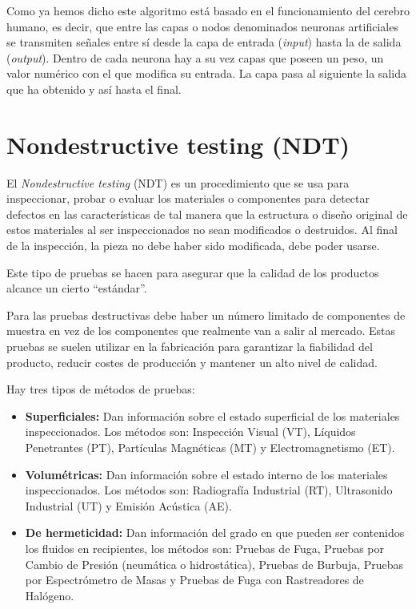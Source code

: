 Como ya hemos dicho este algoritmo está basado en el funcionamiento del cerebro humano, es decir, que entre las capas o nodos denominados neuronas artificiales se transmiten señales entre sí desde la capa de entrada (\textit{input}) hasta la de salida (\textit{output}). Dentro de cada neurona hay a su vez capas que poseen un peso, un valor numérico con el que modifica su entrada. La capa pasa al siguiente la salida que ha obtenido y así hasta el final.


\section{Nondestructive testing (NDT)}

El \textit{Nondestructive testing} (NDT) \cite{NDT} es un procedimiento que se usa para inspeccionar, probar o evaluar los materiales o componentes para detectar defectos en las características de tal manera que la estructura o diseño original de estos materiales al ser inspeccionados no sean modificados o destruidos. Al final de la inspección, la pieza no debe haber sido modificada, debe poder usarse.

Este tipo de pruebas se hacen para asegurar que la calidad de los productos alcance un cierto ``estándar''.

Para las pruebas destructivas debe haber un número limitado de componentes de muestra en vez de los componentes que realmente van a salir al mercado. Estas pruebas se suelen utilizar en la fabricación para garantizar la fiabilidad del producto, reducir costes de producción y mantener un alto nivel de calidad.

Hay tres tipos de métodos de pruebas:
\begin{itemize}
    \item \textbf{Superficiales:} Dan información sobre el estado superficial de los materiales inspeccionados. Los métodos son: Inspección Visual (VT), Líquidos Penetrantes (PT), Partículas Magnéticas (MT) y Electromagnetismo (ET).
    \item \textbf{Volumétricas:} Dan información sobre el estado interno de los materiales inspeccionados. Los métodos son: Radiografía Industrial (RT), Ultrasonido Industrial (UT) y Emisión Acústica (AE).
    \item \textbf{De hermeticidad:} Dan información del grado en que pueden ser contenidos los fluidos en recipientes, los métodos son: Pruebas de Fuga, Pruebas por Cambio de Presión (neumática o hidrostática), Pruebas de Burbuja, Pruebas por Espectrómetro de Masas y Pruebas de Fuga con Rastreadores de Halógeno.
\end{itemize}

